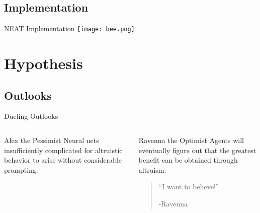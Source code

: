 \documentclass{beamer}
\begin{document}
    \subsection{Implementation}
    \begin{frame}{NEAT Implementation}
        \texttt{[image: bee.png]}
    \end{frame}

    \section{Hypothesis}
    \subsection{Outlooks}
    \begin{frame}{Dueling Outlooks}
        \begin{columns}[t]
                \begin{block}{Alex the Pessimist}
                        Neural nets insufficiently complicated for altruistic behavior to arise 
                        without considerable prompting.
                \end{block}
                \begin{block}{Ravenna the Optimist}
                        Agents will eventually figure out that the greatest benefit can be obtained 
                        through altruism.
                    \begin{quote}
                        ``I want to believe!''
                        \begin{flushright}
                            -Ravenna
                        \end{flushright} 
                    \end{quote}
                \end{block}
        \end{columns}
    \end{frame}
\end{document}
